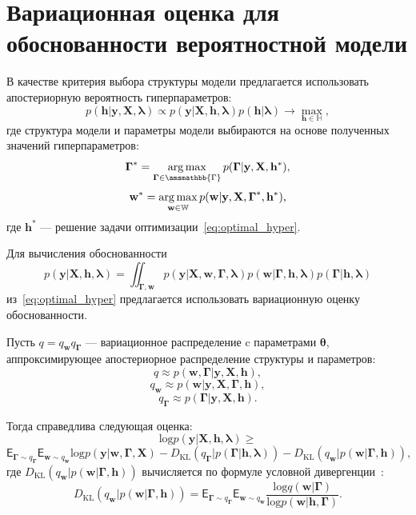 \section{Вариационная оценка для обоснованности вероятностной модели}
В качестве критерия выбора структуры модели предлагается использовать апостериорную вероятность гиперпараметров:
\begin{equation}
\label{eq:optimal_hyper}
    p(\mathbf{h}|\mathbf{y}, \mathbf{X}, \boldsymbol{\lambda}) \propto p(\mathbf{y}|\mathbf{X}, \mathbf{h}, \boldsymbol{\lambda}) p(\mathbf{h}|\boldsymbol{\lambda}) \to \max_{\mathbf{h} \in \mathbb{H}},
\end{equation}
где структура модели и параметры модели выбираются на основе полученных значений гиперпараметров:
\[
    \boldsymbol{\Gamma}^* = \argmax_{\boldsymbol{\Gamma} \in \amsmathbb{\Gamma}} p(\boldsymbol{\Gamma}|\mathbf{y}, \mathbf{X}, \mathbf{h}^*),
\]
\[
    \mathbf{w}^* = \operatorname*{arg\,max}_{\mathbf{w} \in \mathbb{W}} p(\mathbf{w}|\mathbf{y}, \mathbf{X}, \boldsymbol{\Gamma}^*, \mathbf{h}^*),
\]
где $\mathbf{h}^*$ --- решение задачи оптимизации~\eqref{eq:optimal_hyper}.

Для вычисления обоснованности $$p(\mathbf{y}|\mathbf{X}, \mathbf{h}, \boldsymbol{\lambda}) = \iint_{\boldsymbol{\Gamma},\mathbf{w}}p(\mathbf{y}|\mathbf{X}, \mathbf{w}, \boldsymbol{\Gamma},\boldsymbol{\lambda})p(\mathbf{w}|\boldsymbol{\Gamma},\mathbf{h}, \boldsymbol{\lambda})p(\boldsymbol{\Gamma}|\mathbf{h}, \boldsymbol{\lambda})$$ из~\eqref{eq:optimal_hyper} предлагается использовать вариационную оценку обоснованности.

\begin{theorem}
Пусть $q = q_{\mathbf{w}}q_{\boldsymbol{\Gamma}}$ --- вариационное распределение c параметрами $\boldsymbol{\theta}$, аппроксимирующее апостериорное распределение структуры и параметров:
\[
    q \approx p(\mathbf{w},\boldsymbol{\Gamma}|\mathbf{y}, \mathbf{X}, \mathbf{h}),
\]
\[
    q_{\mathbf{w}} \approx p(\mathbf{w}|\mathbf{y}, \mathbf{X},  \boldsymbol{\Gamma},\mathbf{h}),
\]
\[
    q_{\boldsymbol{\Gamma}} \approx p(\boldsymbol{\Gamma}|\mathbf{y}, \mathbf{X},  \mathbf{h}).
\]

Тогда справедлива следующая оценка:
\begin{equation}
\label{eq:full_elbo}
\text{log} p(\mathbf{y}|\mathbf{X}, \mathbf{h}, \boldsymbol{\lambda}) \geq
\end{equation}
\[
 \mathsf{E}_{\boldsymbol{\Gamma} \sim q_{\boldsymbol{\Gamma}}}\mathsf{E}_{\mathbf{w} \sim q_{\mathbf{w}}} \text{log}p(\mathbf{y}|\mathbf{w}, \boldsymbol{\Gamma}, \mathbf{X}) - D_\text{KL}\left(q_{\boldsymbol{\Gamma}}|p(\boldsymbol{\Gamma}|\mathbf{h}, \boldsymbol{\lambda})\right) - D_\text{KL}\left(q_{\mathbf{w}}|p(\mathbf{w}|\boldsymbol{\Gamma}, \mathbf{h})\right),
\]
где $D_\text{KL}\left(q_{\mathbf{w}}|p(\mathbf{w}|\boldsymbol{\Gamma}, \mathbf{h})\right)$ вычисляется по формуле условной дивергенции~\cite{TODO}:
\[
D_\text{KL}\left(q_{\mathbf{w}}|p(\mathbf{w}|\boldsymbol{\Gamma}, \mathbf{h})\right) = \mathsf{E}_{\boldsymbol{\Gamma} \sim q_{\boldsymbol{\Gamma}}} \mathsf{E}_{\mathbf{w} \sim q_{\mathbf{w}}} \frac{\text{log}q(\mathbf{w}|\boldsymbol{\Gamma})}{\text{log}p(\mathbf{w}|\mathbf{h},\boldsymbol{\Gamma})}.
\]
\end{theorem}

